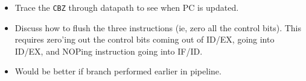 \begin{frame}[fragile]
\BNotes\ifnum{}
\begin{itemize}
	\item Trace the {\tt CBZ} through datapath to see when PC is updated.
	\item Discuss how to flush the three instructions (ie, zero all the
		control bits).  This requires zero'ing out the control bits
		coming out of ID/EX, going into ID/EX, and NOPing instruction
		going into IF/ID.
	\item Would be better if branch performed earlier in pipeline.
\end{itemize}
\fi\ENotes
\end{frame}






